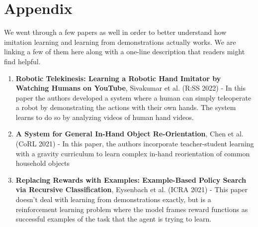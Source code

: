 \documentclass[11pt]{article}
\begin{document}
\section{Appendix}
We went through a few papers as well in order to better understand how imitation learning and learning from demonstrations actually works. We are linking a few of them here along with a one-line description that readers might find helpful.

\begin{enumerate}
    \item \textbf{Robotic Telekinesis: Learning a Robotic Hand Imitator by Watching Humans on YouTube}, Sivakumar et al. (R:SS 2022) - In this paper the authors developed a system where a human can simply teleoperate a robot by demonstrating the actions with their own hands. The system learns to do so by analyzing videos of human hand videos.  \cite{telekinesis}
    \item \textbf{A System for General In-Hand Object Re-Orientation}, Chen et al. (CoRL 2021) -  In this paper, the authors incorporate teacher-student learning with a gravity curriculum to learn complex in-hand reorientation of common household objects\cite{chen2022}
    \item \textbf{Replacing Rewards with Examples: Example-Based Policy Search via Recursive Classification}, Eysenbach et al. (ICRA 2021) - This paper doesn't deal with learning from demonstrations exactly, but is a reinforcement learning problem where the model frames reward functions as successful examples of the task that the agent is trying to learn. \cite{eysenbach2021}
\end{enumerate}
{


}


\end{document}
